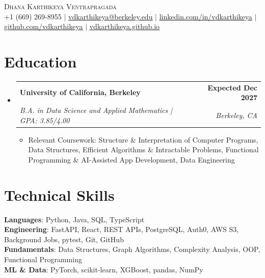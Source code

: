 \documentclass[letterpaper,11pt]{article}
\makeatletter
\newcommand{\resumeItem}[1]{%
  \item\small{{#1\vspace{-2pt}}}%
}
\newcommand{\resumeSubheading}[4]{
  \vspace{-2pt}\item
    \begin{tabular*}{1.0\textwidth}[t]{l@{\extracolsep{\fill}}r}
      \textbf{#1} & \textbf{\small #2} \\
      \textit{\small#3} & \textit{\small #4} \\
    \end{tabular*}\vspace{-7pt}
}
\newcommand{\resumeSubHeadingListStart}{\begin{itemize}[leftmargin=0.0in, label={}]}
\newcommand{\resumeSubHeadingListEnd}{\end{itemize}}
\newcommand{\resumeItemListStart}{\begin{itemize}[itemsep=2.5pt, topsep=3pt]}
\newcommand{\resumeItemListEnd}{\end{itemize}\vspace{-4pt}}
\makeatother
\begin{document}
\begin{center}
    {\Huge \scshape Dhana Karthikeya Ventrapragada} \\ \vspace{1pt}
        \footnotesize
    +1 (669) 269-8955 $|$
    \href{mailto:vdkarthikeya@berkeley.edu}{\uline{vdkarthikeya@berkeley.edu}} $|$
    \href{https://www.linkedin.com/in/vdkarthikeya/}{\uline{linkedin.com/in/vdkarthikeya}} $|$
    \href{https://github.com/vdkarthikeya}{\uline{github.com/vdkarthikeya}} $|$
    \href{https://vdkarthikeya.github.io}{\uline{vdkarthikeya.github.io}}
    \vspace{-8pt}
\end{center}

\section{Education}
\resumeSubHeadingListStart

\resumeSubheading
{University of California, Berkeley}{Expected Dec 2027}
{B.A. in Data Science and Applied Mathematics \;|\; GPA: 3.85/4.00}{Berkeley, CA}

\vspace{-6pt}
\resumeItemListStart
\resumeItem{Relevant Coursework: Structure \& Interpretation of Computer Programs, Data Structures, Efficient Algorithms \& Intractable Problems, Functional Programming \& AI-Assisted App Development, Data Engineering}
\resumeItemListEnd
\resumeSubHeadingListEnd
\vspace{-14pt}

\section{Technical Skills}
 \begin{itemize}[leftmargin=0.15in, label={}, itemsep=3pt]
    \small{\item{
     \textbf{Languages}{: Python, Java, SQL, TypeScript} \\[2pt]
     \textbf{Engineering}{: FastAPI, React, REST APIs, PostgreSQL, Auth0, AWS S3, Background Jobs, pytest, Git, GitHub} \\[2pt]
     \textbf{Fundamentals}{: Data Structures, Graph Algorithms, Complexity Analysis, OOP, Functional Programming} \\[2pt]
     \textbf{ML \& Data}{: PyTorch, scikit-learn, XGBoost, pandas, NumPy}
    }}
 \end{itemize}
 \vspace{-15pt}
\end{document}
